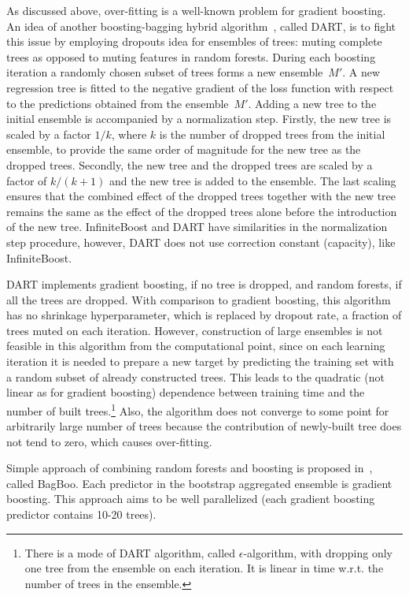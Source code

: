 As discussed above, over-fitting is a well-known problem for gradient boosting. 
An idea of another boosting-bagging hybrid algorithm~\cite{key-dart}, called DART, is to fight this issue by employing dropouts idea for ensembles of trees: muting complete trees as opposed to muting features in random forests. 
During each boosting iteration a randomly chosen subset of trees forms a new ensemble~$M'$. 
A new regression tree is fitted to the negative gradient of the loss function with respect to the predictions obtained from the ensemble~$M'$.
Adding a new tree to the initial ensemble is accompanied by a normalization step.
Firstly, the new tree is scaled by a factor $1/k$, where $k$ is the number of dropped trees from the initial ensemble, to provide the same order of magnitude for the new tree as the dropped trees. 
Secondly, the new tree and the dropped trees are scaled by a factor of $k/(k+1)$ and the new tree is added to the ensemble.
The last scaling ensures that the combined effect of the dropped trees together with the new tree remains the
same as the effect of the dropped trees alone before the introduction of the new tree.
InfiniteBoost and DART have similarities in the normalization step procedure, however, DART does not use correction constant (capacity), like InfiniteBoost.

DART implements gradient boosting, if no tree is dropped, and random forests, if all the trees are dropped.
With comparison to gradient boosting, this algorithm has no shrinkage hyperparameter, which is replaced by dropout rate, a fraction of trees muted on each iteration.
However, construction of large ensembles is not feasible in this algorithm from the computational point,
since on each learning iteration it is needed to prepare a new target by predicting the training set with a random subset of already constructed trees.
This leads to the quadratic (not linear as for gradient boosting) dependence between training time and the number of built trees.\footnote{
There is a mode of DART algorithm, called $\epsilon$-algorithm, with dropping only one tree from the ensemble on each iteration.
It is linear in time w.r.t. the number of trees in the ensemble.}
Also, the algorithm does not converge to some point for arbitrarily large number of trees because the contribution of newly-built tree does not tend to zero, which causes over-fitting.

Simple approach of combining random forests and boosting is proposed in~\cite{key-bagboo}, called BagBoo. 
Each predictor in the bootstrap aggregated ensemble is gradient boosting. 
This approach aims to be well parallelized (each gradient boosting predictor contains 10-20 trees).


